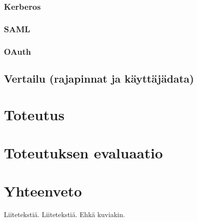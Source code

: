 \documentclass{tktltiki}
\begin{document}
\subsubsection{Kerberos}

\subsubsection{SAML}

\subsubsection{OAuth}

\subsection{Vertailu (rajapinnat ja käyttäjädata)}

\section{Toteutus}
\section{Toteutuksen evaluaatio}
\section{Yhteenveto}


\lastpage
\appendices
{}
Liitetekstiä.
Liitetekstiä. Ehkä kuviakin.
\end{document}
